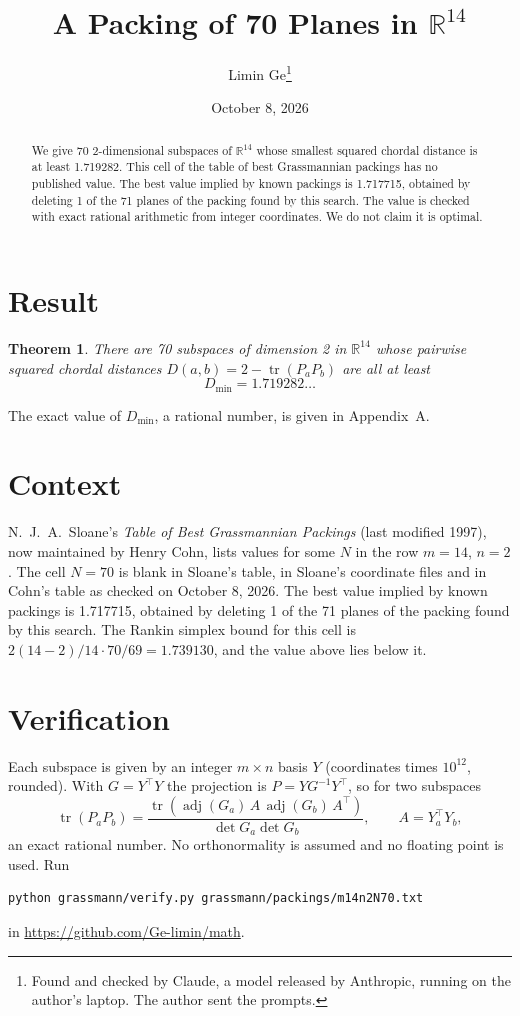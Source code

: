 \documentclass[11pt,a4paper]{article}
\title{A Packing of 70 Planes in $\mathbb{R}^{14}$}
\author{Limin Ge\thanks{Found and checked by Claude, a model released by Anthropic, running on the author's laptop. The author sent the prompts.}}
\date{October 8, 2026}
\newtheorem*{theorem}{Theorem}
\begin{document}
\maketitle
\begin{abstract}
We give 70 2-dimensional subspaces of $\mathbb{R}^{14}$ whose smallest squared chordal distance is at least 1.719282. This cell of the table of best Grassmannian packings has no published value. The best value implied by known packings is 1.717715, obtained by deleting 1 of the 71 planes of the packing found by this search. The value is checked with exact rational arithmetic from integer coordinates. We do not claim it is optimal.
\end{abstract}

\section{Result}
\begin{theorem}
There are 70 subspaces of dimension 2 in $\mathbb{R}^{14}$ whose pairwise squared chordal distances $D(a,b) = 2 - \operatorname{tr}(P_aP_b)$ are all at least
\[ D_{\min} = 1.719282\ldots \]
\end{theorem}
The exact value of $D_{\min}$, a rational number, is given in Appendix~A.


\section{Context}
N.~J.~A.~Sloane's \emph{Table of Best Grassmannian Packings} (last modified 1997), now maintained by Henry Cohn, lists values for some $N$ in the row $m=14$, $n=2$. The cell $N=70$ is blank in Sloane's table, in Sloane's coordinate files and in Cohn's table as checked on October 8, 2026. The best value implied by known packings is 1.717715, obtained by deleting 1 of the 71 planes of the packing found by this search. The Rankin simplex bound for this cell is $2(14-2)/14\cdot 70/69 = 1.739130$, and the value above lies below it.


\section{Verification}
Each subspace is given by an integer $m\times n$ basis $Y$ (coordinates times $10^{12}$, rounded). With $G=Y^\top Y$ the projection is $P=YG^{-1}Y^\top$, so for two subspaces
\[ \operatorname{tr}(P_aP_b)=\frac{\operatorname{tr}(\operatorname{adj}(G_a)\,A\,\operatorname{adj}(G_b)\,A^\top)}{\det G_a\det G_b},\qquad A=Y_a^\top Y_b, \]
an exact rational number. No orthonormality is assumed and no floating point is used. Run
\begin{verbatim}
python grassmann/verify.py grassmann/packings/m14n2N70.txt
\end{verbatim}
in \url{https://github.com/Ge-limin/math}.
\end{document}
